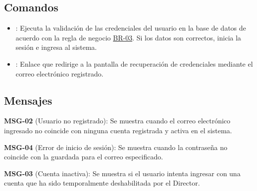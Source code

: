 \subsection{Comandos}
\begin{itemize}
	\item {}: Ejecuta la validación de las credenciales del usuario en la base de datos de acuerdo con la regla de negocio \hyperlink{BR-03}{BR-03}. Si los datos son correctos, inicia la sesión e ingresa al sistema.
	\item {}: Enlace que redirige a la pantalla de recuperación de credenciales mediante el correo electrónico registrado.
\end{itemize}

\subsection{Mensajes}
\begin{Citemize}
	\item {\bf MSG-02} (Usuario no registrado): Se muestra cuando el correo electrónico ingresado no coincide con ninguna cuenta registrada y activa en el sistema.
	\item {\bf MSG-04} (Error de inicio de sesión): Se muestra cuando la contraseña no coincide con la guardada para el correo especificado.
	\item {\bf MSG-03} (Cuenta inactiva): Se muestra si el usuario intenta ingresar con una cuenta que ha sido temporalmente deshabilitada por el Director.
\end{Citemize}

